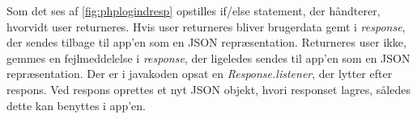 \noindent
Som det ses af \autoref{fig:phplogindresp} opstilles if/else statement, der håndterer, hvorvidt user returneres. Hvis user returneres bliver brugerdata gemt i \textit{response}, der sendes tilbage til app'en som en JSON repræsentation. Returneres user ikke, gemmes en fejlmeddelelse i \textit{response}, der ligeledes sendes til app'en som en JSON repræsentation. 
Der er i javakoden opsat en \textit{Response.listener}, der lytter efter respons. Ved respons oprettes et nyt JSON objekt, hvori responset lagres, således dette kan benyttes i app'en. 